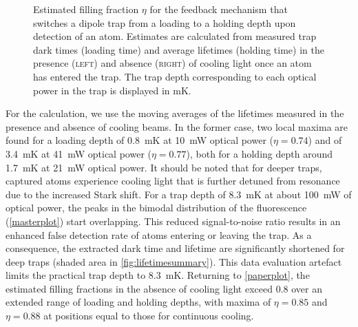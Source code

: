 \documentclass[../Thesis-IJspeert.tex]{subfiles}
\begin{document}
\begin{figure}[t]
	\caption[Estimated filling fractions for the feedback mechanism that switches a dipole trap from a loading to a holding depth upon detection of an atom]{Estimated filling fraction $\eta$ for the feedback mechanism that switches a dipole trap from a loading to a holding depth upon detection of an atom. Estimates are calculated from measured trap dark times (loading time) and average lifetimes (holding time) in the presence \textsc{(left)} and absence \textsc{(right)} of cooling light once an atom has entered the trap. The trap depth corresponding to each optical power in the trap is displayed in \si{\milli\kelvin}.} 
	\label{paperplot} 
\end{figure}
For the calculation, we use the moving averages of the lifetimes measured in the presence and absence of cooling beams. In the former case, two local maxima are found for a loading depth of \SI{0.8}{\milli\kelvin} at \SI{10}{\milli\watt} optical power ($\eta=0.74$) and of \SI{3.4}{\milli\kelvin} at \SI{41}{\milli\watt} optical power ($\eta=0.77$), both for a holding depth around \SI{1.7}{\milli\kelvin} at \SI{21}{\milli\watt} optical power. It should be noted that for deeper traps, captured atoms experience cooling light that is further detuned from resonance due to the increased Stark shift. For a trap depth of \SI{8.3}{\milli\kelvin} at about \SI{100}{\milli\watt} of optical power, the peaks in the bimodal distribution of the fluorescence (\autoref{masterplot}) start overlapping. This reduced signal-to-noise ratio results in an enhanced false detection rate of atoms entering or leaving the trap. As a consequence, the extracted dark time and lifetime are significantly shortened for deep traps (shaded area in \autoref{fig:lifetimesummary}). This data evaluation artefact limits the practical trap depth to \SI{8.3}{\milli\kelvin}. Returning to \autoref{paperplot}, the estimated filling fractions in the absence of cooling light exceed $0.8$ over an extended range of loading and holding depths, with maxima of $\eta=0.85$ and $\eta=0.88$ at positions equal to those for continuous cooling.
\end{document}
